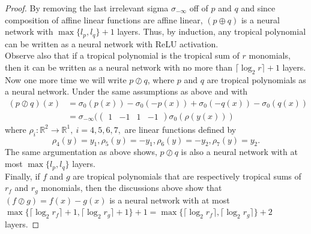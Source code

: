 \documentclass{article}
\theoremstyle{definition}
\begin{document}
\begin{proof}
By removing the last irrelevant sigma $\sigma_{- \infty}$ off of $p$ and $q$ and since composition of affine linear functions are affine linear, $(p\oplus q)$ is a neural network with $\max \{ l_{p}, l_{q} \} + 1$ layers. Thus, by induction, any tropical polynomial can be written as a neural network with ReLU activation. \\
Observe also that if a tropical polynomial is the tropical sum of $r$ monomials, then it can be written as a neural network with no more than
$\lceil \log_{2} r \rceil + 1$ layers. Now one more time we will write $p \oslash q$, where $p$ and $q$ are tropical polynomials as a neural network. Under the same assumptions as above and with
\begin{align*}
(p \oslash q)(x)
&= \sigma_{0}(p(x)) - \sigma_{0}(-p(x)) + \sigma_{0}(-q(x)) - \sigma_{0}(q(x)) \\
&= \sigma_{- \infty }(\begin{pmatrix} 1 & -1 & 1 & -1 \end{pmatrix} \sigma_{0}(\rho(y(x)))
\end{align*}
where $\rho_{i}:\mathbb{R}^{2} \to \mathbb{R}^{1}, \ i=4,5,6,7,$ are linear functions defined by
$$\rho_{4}(y)=y_{1}, \rho_{5}(y)=-y_{1}, \rho_{6}(y)=-y_{2}, \rho_{7}(y)=y_{2}.$$
The same argumentation as above shows, $p \oslash q$ is also a neural network with at most $\max \{ l_{p}, l_{q} \}$ layers. \\
Finally, if $f$ and $g$ are tropical polynomials that are respectively tropical sums of $r_{f}$ and $r_{g}$ monomials, then the discussions
above show that $(f \oslash g) = f(x) - g(x)$ is a neural network with at most $\max \{ \lceil \log_{2}r_{f} \rceil + 1, \lceil \log_{2}r_g \rceil + 1 \} + 1 = \max \{ \lceil \log_{2}r_{f} \rceil, \lceil \log_{2}r_g \rceil \} + 2$ layers.
\end{proof}
\end{document}
